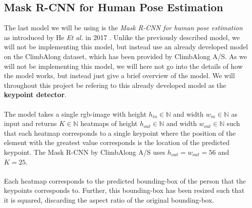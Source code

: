 \documentclass[./main.tex]{subfiles}
\begin{document}
\subsection{Mask R-CNN for Human Pose Estimation}
\label{sec:Mask_RCNN}
The last model we will be using is the \textit{Mask R-CNN for human pose estimation} as introduced by He \textit{Et al.} in 2017 \cite{https://doi.org/10.48550/arxiv.1703.06870}. Unlike the previously described model, we will not be implementing this model, but instead use an already  developed model on the ClimbAlong dataset, which has been provided by ClimbAlong A/S. As we will not be implementing this model, we will here not go into the details of how the model works, but instead just give a brief overview of the model. We will throughout this project be refering to this already developed model as the \textbf{keypoint detector}.
\\
\\
The model takes a single rgb-image with height $h_{in} \in \mathbb{N}$ and width $w_{in} \in \mathbb{N}$ as input and returns $K \in \mathbb{N}$ heatmaps of height $h_{out} \in \mathbb{N}$ and width $w_{out} \in \mathbb{N}$ such that each heatmap corresponds to a single keypoint where the position of the element with the greatest value corresponds is the location of the predicted keypoint. The Mask R-CNN by ClimbAlong A/S uses $h_{out} = w_{out} = 56$ and $K = 25$.
\\
\\
Each heatmap corresponds to the predicted bounding-box of the person that the keypoints corresponds to. Further, this bounding-box has been resized such that it is squared, discarding the aspect ratio of the original bounding-box.
\end{document}
